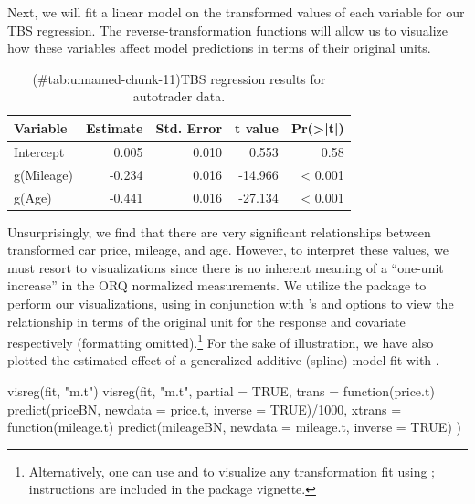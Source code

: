 Next, we will fit a linear model on the transformed values of each
variable for our TBS regression. The reverse-transformation functions
will allow us to visualize how these variables affect model predictions
in terms of their original units.

\begin{Schunk}
\end{Schunk}

\begin{Schunk}
\begin{table}

\caption{(\#tab:unnamed-chunk-11)TBS regression results for autotrader data.}
\centering
\begin{tabular}[t]{lrrrr}
\toprule
Variable & Estimate & Std. Error & t value & Pr(>|t|)\\
\midrule
Intercept & 0.005 & 0.010 & 0.553 & 0.58\\
g(Mileage) & -0.234 & 0.016 & -14.966 & < 0.001\\
g(Age) & -0.441 & 0.016 & -27.134 & < 0.001\\
\bottomrule
\end{tabular}
\end{table}

\end{Schunk}

Unsurprisingly, we find that there are very significant relationships
between transformed car price, mileage, and age. However, to interpret
these values, we must resort to visualizations since there is no
inherent meaning of a ``one-unit increase'' in the ORQ normalized
measurements. We utilize the  package \citep{visreg} to
perform our visualizations, using  in
conjunction with 's  and  options
to view the relationship in terms of the original unit for the response
and covariate respectively (formatting
omitted).\footnote{Alternatively, one can use  \citep{scales} and  \citep{ggplot2} to visualize any transformation fit using ; instructions are included in the package vignette.}
For the sake of illustration, we have also plotted the estimated effect
of a generalized additive (spline) model fit with 
\citep{mgcv}.

\begin{Schunk}
\begin{Sinput}
visreg(fit, "m.t")
visreg(fit, "m.t", 
       partial = TRUE,
       trans = function(price.t) 
         predict(priceBN, newdata = price.t, inverse = TRUE)/1000, 
       xtrans = function(mileage.t) 
         predict(mileageBN, newdata = mileage.t, inverse = TRUE)
       )
\end{Sinput}
\end{Schunk}

